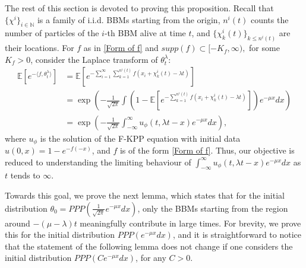 \documentclass[a4paper,reqno]{amsart}%
\newcommand{\1}{\mathbf 1}
\theoremstyle{mine}
\numberwithin{theorem}{section}
\numberwithin{equation}{section}
\theoremstyle{remark}
\begin{document}
The rest of this section is devoted to proving this proposition. 
Recall that $\{\chi^i\}_{i \in \mathbb N}$ is a family of i.i.d. BBMs starting from the origin, $n^i(t)$ counts the number of particles of the $i$-th BBM alive at time $t$, and $\{\chi_k^i(t)\}_{k \le n^i(t)}$ are their locations.
For $f$ as in \eqref{Form of f} and $supp (f) \subset [-K_f, \infty), $ for some $K_f>0$, consider the Laplace transform of $\theta_{t}^\lambda:$
\begin{align}
 \nonumber \mathbb{E}[e^{-\langle f,\theta_{t}^{\lambda}\rangle}]
&=\mathbb{E}[e^{-\sum_{i=1}^{\infty}\sum_{k=1 }^{n^i(t)}f(x_{i}+\chi_{k}^{i}(t)-\lambda t)}]\\
\nonumber &=\exp\left(-\frac{1}{\sqrt{2\pi}}\int (1-\mathbb E[e^{-\sum_{k=1 }^{n^i(t)}f(x_{i}+\chi_{k}^{i}(t)-\lambda t)}])e^{-\mu x}dx\right)\\
 \label{Laplace from PPP} &=\exp\left(-\frac{1}{\sqrt{2\pi}}\int_{-\infty}^{\infty}u_{\phi }(t,\lambda t-x)e^{-\mu x}dx\right) ,
\end{align}
where $u_{\phi}$ is the solution of the F-KPP equation
with initial data $u(0,x) = 1-e^{-f(-x)}$, and $f$ is of the form \eqref{Form of f}.
Thus, our objective is reduced to understanding the limiting behaviour of $\int_{-\infty}^{\infty}u_{\phi }(t,\lambda t-x)e^{-\mu x}dx$ as $t$ tends to $\infty$.

Towards this goal, we prove the next lemma, which states that for the initial distribution $ \theta_0= PPP(\frac{1}{\sqrt{2\pi}}e^{-\mu x}dx)$, only the BBMs starting from the region around $-(\mu-\lambda)t$ meaningfully contribute in large times.
For brevity, we prove this for the initial distribution $PPP(e^{-\mu x}dx)$, and it is straightforward to notice that the statement of the following lemma does not change if one considers the initial distribution $PPP(Ce^{-\mu x}dx)$, for any $C>0.$
\end{document}

